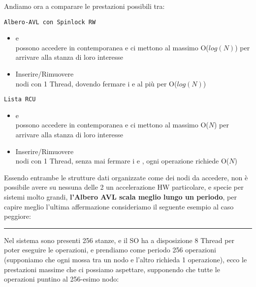Andiamo ora a comparare le prestazioni possibili tra:

\begin{minipage}{0.45\linewidth}
\begin{center}
\texttt{Albero-AVL con Spinlock RW}
\end{center}

\begin{itemize}
 \item[\faSmileO] \Writer e \Reader\\
possono accedere in contemporanea e ci mettono al {\color{red}massimo O($log(N)$)} per arrivare alla stanza di loro
interesse
\item[\faMehO\faFrownO\faSmileO] Inserire/Rimuovere\\
nodi con {\color{orange}1 Thread}, dovendo fermare i \Writer e \Reader al più per {\color{red}O($log(N)$)}

\end{itemize}
\end{minipage}
\hfill
\begin{minipage}{0.45\linewidth}
\begin{center}
\texttt{Lista RCU}
\end{center}

\begin{itemize}
 \item[\faFrownO] \Writer e \Reader\\
possono accedere in contemporanea e ci mettono al {\color{red}massimo O($N$)} per arrivare alla stanza di loro
interesse
 \item[\faMehO\faSmileO\faFrownO] Inserire/Rimuovere\\
nodi con {\color{orange}1 Thread}, senza mai fermare i \Writer e \Reader, ogni operazione richiede
{\color{red}O($N$)}
\end{itemize}
\end{minipage}

Essendo entrambe le strutture dati organizzate come dei nodi da accedere, non è possibile avere su nessuna delle 2 un
accelerazione HW particolare, e specie per sistemi molto grandi, \textbf{l'Albero AVL scala meglio lungo un periodo},
per capire meglio l'ultima affermazione consideriamo il seguente esempio al caso peggiore:

\rule{\linewidth}{0.5pt}
Nel sistema sono presenti {\color{orange}256 stanze}, e il SO ha a disposizione {\color{orange}8 Thread} per
poter eseguire le operazioni, e prendiamo come periodo {\color{orange}256 operazioni} (supponiamo che ogni
mossa tra un nodo e l'altro richieda 1 operazione), ecco le prestazioni massime che ci possiamo aspettare, supponendo
che tutte le operazioni puntino al 256-esimo nodo:

